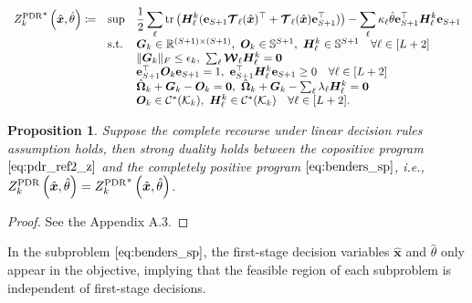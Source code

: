 \documentclass{article}
\newcommand{\st}{\textnormal{s.t.}}
\newcommand{\RR}{\mathbb{R}}
\newcommand{\tr}{\textup{tr}}
\newtheorem{proposition}{Proposition}
\begin{document}
\begin{equation}
\label{eq:benders_sp}
\begin{array}{clll}
{Z^{\textup{PDR}}_k}^* \left(\hat{\bm x}, \hat{\theta} \right) \coloneqq & \displaystyle \sup & \displaystyle \frac{1}{2}\sum_\ell  \tr\left (\bm H_\ell^k(\mathbf{e}_{S+1} \bm{\mathcal{T}}_\ell (\hat{\bm x})^\top + \bm{\mathcal{T}}_\ell (\hat{\bm x}) \mathbf{e}_{S+1}^\top)\right )  - \sum_\ell \kappa_\ell \hat{\theta} \mathbf{e}_{S+1}^\top \bm H_\ell^k \mathbf{e}_{S+1} \\
& \st & \bm G_k \in \RR^{(S+1) \times (S+1)}, \ \bm O_k \in \mathbb{S}^{S+1}, \ \bm H_\ell^k \in \mathbb{S}^{S+1} \quad \forall \ell \in [L+2] \\
& & \|\bm G_k\|_F \leq \epsilon_k, \ \sum_\ell \bm{\mathcal W}_\ell \bm H_\ell^k = \bm 0 \\
& & \mathbf{e}_{S+1}^\top \bm O_k \mathbf{e}_{S+1} = 1, \ \mathbf{e}_{S+1}^\top \bm H_\ell^k \mathbf{e}_{S+1} \geq 0 \quad \forall \ell \in [L+2] \\
& & \hat{\bm \Omega}_k + \bm G_k - \bm O_k  = \bm 0, \ \hat{\bm \Omega}_k + \bm G_k - \sum_\ell \lambda_\ell \bm H_\ell^k  = \bm 0 \\
& & \bm O_k \in \mathcal{C^*}(\mathcal{K}_k), \ \bm H_\ell^k \in \mathcal{C^*}(\mathcal{K}_k) \quad \forall \ell \in [L+2].\\
\end{array}
\end{equation}

\begin{proposition} \label{prop5}
Suppose the complete recourse under linear decision rules assumption holds, then strong duality holds between the copositive program $\eqref{eq:pdr_ref2_z}$ and the completely positive program $\eqref{eq:benders_sp}$, i.e., $Z^{\textup{PDR}}_k \left(\hat{\bm x}, \hat{\theta} \right) = {Z^{\textup{PDR}}_k}^* \left(\hat{\bm x}, \hat{\theta} \right)$. %
\end{proposition}

\begin{proof}
See the Appendix A.3.
\end{proof}
\noindent In the subproblem $\eqref{eq:benders_sp}$, the first-stage decision variables $\hat{\bm x}$ and $\hat{\theta}$ only appear in the objective, implying that the feasible region of each subproblem is independent of  first-stage decisions. 
\end{document}

